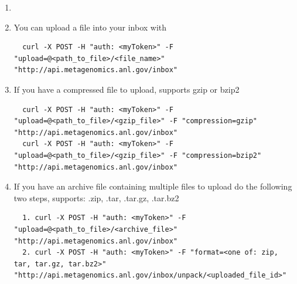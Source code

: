 \documentclass[12pt,fullpage]{report}
\begin{document}
\begin{enumerate}
\item 
\item You can upload a file into your inbox with
\begin{small}
\begin{lstlisting}
  curl -X POST -H "auth: <myToken>" -F "upload=@<path_to_file>/<file_name>" "http://api.metagenomics.anl.gov/inbox"
\end{lstlisting}
\end{small}
\item If you have a compressed file to upload, supports gzip or bzip2
\begin{small}
\begin{lstlisting}
  curl -X POST -H "auth: <myToken>" -F "upload=@<path_to_file>/<gzip_file>" -F "compression=gzip" "http://api.metagenomics.anl.gov/inbox"
  curl -X POST -H "auth: <myToken>" -F "upload=@<path_to_file>/<gzip_file>" -F "compression=bzip2" "http://api.metagenomics.anl.gov/inbox"
\end{lstlisting}
\end{small}
\item If you have an archive file containing multiple files to upload do the following two steps, supports: .zip, .tar, .tar.gz, .tar.bz2
\begin{small}
\begin{lstlisting}
  1. curl -X POST -H "auth: <myToken>" -F "upload=@<path_to_file>/<archive_file>" "http://api.metagenomics.anl.gov/inbox"
  2. curl -X POST -H "auth: <myToken>" -F "format=<one of: zip, tar, tar.gz, tar.bz2>" "http://api.metagenomics.anl.gov/inbox/unpack/<uploaded_file_id>"
\end{lstlisting}
\end{small}
\end{enumerate}



\end{document}
